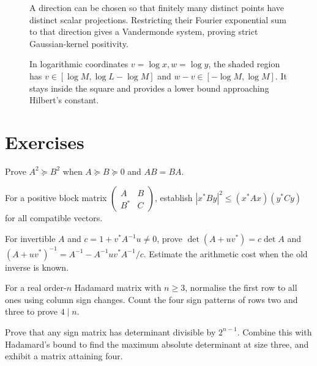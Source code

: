 \begin{figure}[ht]
\centering{}
\caption{A direction can be chosen so that finitely many distinct points have distinct scalar projections. Restricting their Fourier exponential sum to that direction gives a Vandermonde system, proving strict Gaussian-kernel positivity.}
\label{fig:v8appEprojection}
\end{figure}
\begin{figure}[ht]
\centering{}
\caption{In logarithmic coordinates $v=\log x,w=\log y$, the shaded region has $v\in[\log M,\log L-\log M]$ and $w-v\in[-\log M,\log M]$. It stays inside the square and provides a lower bound approaching Hilbert's constant.}
\label{fig:v8appEhilbert}
\end{figure}
\section{Exercises}
\begin{exercise}[$\star$]\label{linear:ex:commutingsquare}
Prove $A^2\succeq B^2$ when $A\succeq B\succeq0$ and $AB=BA$.
\end{exercise}
\begin{exercise}[$\star$]\label{linear:ex:blockcs}
For a positive block matrix $\begin{pmatrix}A&B\\B^*&C\end{pmatrix}$, establish $|x^*By|^2\le(x^*Ax)(y^*Cy)$ for all compatible vectors.
\end{exercise}
\begin{exercise}[$\star\star$]\label{linear:ex:sherman}
For invertible $A$ and $c=1+v^*A^{-1}u\ne0$, prove $\det(A+uv^*)=c\det A$ and $(A+uv^*)^{-1}=A^{-1}-A^{-1}uv^*A^{-1}/c$. Estimate the arithmetic cost when the old inverse is known.
\end{exercise}
\begin{exercise}[$\star\star$]\label{linear:ex:hadamard4}
For a real order-$n$ Hadamard matrix with $n\ge3$, normalise the first row to all ones using column sign changes. Count the four sign patterns of rows two and three to prove $4\mid n$.
\end{exercise}
\begin{exercise}[$\star\star$]\label{linear:ex:maxdet3}
Prove that any sign matrix has determinant divisible by $2^{n-1}$. Combine this with Hadamard's bound to find the maximum absolute determinant at size three, and exhibit a matrix attaining four.
\end{exercise}
